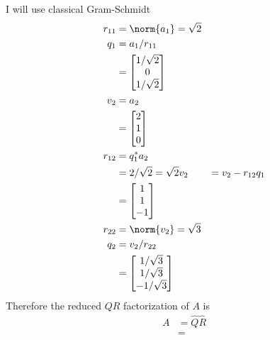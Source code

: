 \documentclass[11pt]{article}
\begin{document}
\begin{enumerate}
\begin{enumerate}
                I will use classical Gram-Schmidt
                \begin{align*}
                    r_{11} &= \norm{a_1} = \sqrt{2} \\
                    q_1 &= a_1/r_{11} \\
                    &= 
                    \begin{bmatrix}
                        1/\sqrt{2} \\
                        0 \\
                        1/\sqrt{2}
                    \end{bmatrix} \\
                    v_2 &= a_2 \\
                    &= 
                    \begin{bmatrix}
                        2 \\
                        1 \\
                        0
                    \end{bmatrix} \\
                    r_{12} &= q_1^* a_2 \\
                    &= 2/\sqrt{2} = \sqrt{2}
                    v_2 &= v_2 - r_{12}q_1 \\
                    &= 
                    \begin{bmatrix}
                        1 \\
                        1 \\
                        -1
                    \end{bmatrix} \\
                    r_{22} &= \norm{v_2} = \sqrt{3} \\
                    q_2 &= v_2/r_{22} \\
                    &=
                    \begin{bmatrix}
                        1/\sqrt{3} \\
                        1/\sqrt{3} \\
                        -1/\sqrt{3}
                    \end{bmatrix}
                \end{align*}
                Therefore the reduced $QR$ factorization of $A$ is
                \begin{align*}
                    A &= \hat{Q} \hat{R} \\
                    &=

\end{align*}
\end{enumerate}
\end{enumerate}
\end{document}
